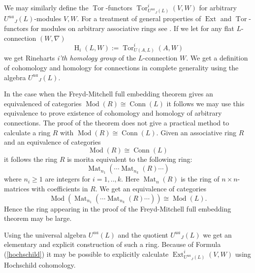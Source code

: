 \documentclass{amsart}
\theoremstyle{plain}
\theoremstyle{definition}
\theoremstyle{remark}
\numberwithin{equation}{theorem}
\begin{document}
We may similarly define the ${\operatorname{Tor} }$-functors ${\operatorname{Tor} }^i_{{U^{ua}}_J(L)}(V,W)$ for arbitrary ${U^{ua}}_J(L)$-modules $V,W$. For 
a treatment of general properties of ${\operatorname{Ext} }$ and ${\operatorname{Tor} }$-functors for modules on arbitrary associative rings 
see \cite{cartan}. If we let for any flat $L$-connection $(W,\nabla)$
\[ {\operatorname{H} }_i(L,W):={\operatorname{Tor} }^i_{U({A},L)}({A},W)\]
we get Rineharts \emph{i'th homology group} of the $L$-connection $W$.
We get a definition of cohomology and homology for connections in complete generality using
the algebra ${U^{ua}}_J(L)$. 

In the case when the Freyd-Mitchell 
full embedding theorem gives an equivalenced of categories ${\operatorname{Mod}}(R)\cong {\operatorname{Conn}}(L)$
it follows we may use this equivalence to prove existence of cohomology and homology of arbitrary connections.
The proof of the theorem does not give a practical method to calculate a ring $R$ with ${\operatorname{Mod}}(R)\cong {\operatorname{Conn}}(L)$. 
Given an associative ring $R$ and an equivalence of categories
\[ {\operatorname{Mod}}(R)\cong {\operatorname{Conn}}(L)\]
it follows the ring $R$ is morita equivalent to the following ring:
\[ {\operatorname{Mat}}_{n_1}(\cdots {\operatorname{Mat}}_{n_k}(R)\cdots ) \]
where $n_i\geq 1$ are integers for $i=1,..,k$. Here ${\operatorname{Mat}}_n(R)$ is the ring of $n\times n$-matrices with coefficients in $R$. 
We get an equivalence of categories
\[ {\operatorname{Mod}}({\operatorname{Mat}}_{n_1}(\cdots {\operatorname{Mat}}_{n_k}(R)\cdots )) \cong {\operatorname{Mod}}(L).\]
Hence the ring appearing in the proof of the Freyd-Mitchell full embedding theorem may be large.

Using the universal algebra ${U^{ua}}(L)$ and the quotient ${U^{ua}}_J(L)$ we get an elementary and explicit construction of such a ring. 
Because of Formula (\ref{hochschild}) it may be possible to explicitly calculate ${\operatorname{Ext} }^i_{{U^{ua}}_J(L)}(V,W)$ 
using Hochschild cohomology. 
\end{document}
